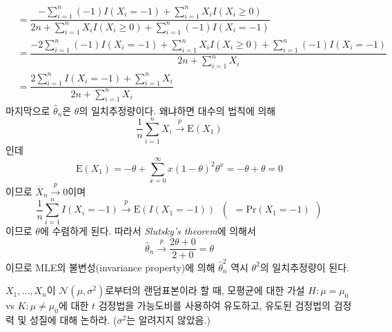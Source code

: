 \documentclass[answers]{exam}
\begin{document}
\begin{questions}
\begin{solution}
\begin{enumerate}[(a)]
\begin{align}
          &= \dfrac{-\displaystyle\sum_{i=1}^{n}\left(-1\right)I\left(X_{i}=-1\right)+\sum_{i=1}^{n}X_{i}I\left(X_{i}\geq 0\right)}{2n+\displaystyle\sum_{i=1}^{n}X_{i}I\left(X_{i}\geq 0\right)+\sum_{i=1}^{n}\left(-1\right)I\left(X_{i}=-1\right)}\\
          &= \dfrac{-2\displaystyle\sum_{i=1}^{n}\left(-1\right)I\left(X_{i}=-1\right)+\sum_{i=1}^{n}X_{i}I\left(X_{i}\geq 0\right)+\sum_{i=1}^{n}\left(-1\right)I\left(X_{i}=-1\right)}{2n+\displaystyle\sum_{i=1}^{n}X_{i}}\\
          &= \dfrac{2\displaystyle\sum_{i=1}^{n}I\left(X_{i}=-1\right)+\sum_{i=1}^{n}X_{i}}{2n+\displaystyle\sum_{i=1}^{n}X_{i}}
        \end{align}
        마지막으로 $\widehat{\theta}_{n}$은 $\theta$의 일치추정량이다. 왜냐하면 대수의 법칙에 의해
        \begin{equation}
          \dfrac{1}{n}\sum_{i=1}^{n}X_{i}\xrightarrow{p} \mathrm{E}\left(X_{1}\right)
        \end{equation}
        인데
        \begin{equation}
          \mathrm{E}\left(X_{1}\right) = -\theta + \sum_{x=0}^{\infty}x\left(1-\theta\right)^{2}\theta^{x} = -\theta+\theta=0
        \end{equation}
        이므로 $\overline{X}_{n}\xrightarrow{p} 0$이며
        \begin{equation}
          \dfrac{1}{n}\sum_{i=1}^{n}I\left(X_{i}=-1\right) \xrightarrow{p} \mathrm{E}\left(I\left(X_{1}=-1\right)\right)\;\;\begin{pmatrix}=\mathrm{Pr}\left(X_{1}=-1\right)\end{pmatrix}
        \end{equation}
        이므로 $\theta$에 수렴하게 된다. 따라서 \emph{Slutsky's theorem}에 의해서
        \begin{equation}
          \widehat{\theta}_{n} \xrightarrow{p} \dfrac{2\theta + 0}{2 + 0} = \theta
        \end{equation}
        이므로 MLE의 불변성(invariance property)에 의해 $\widehat{\theta}_{n}^{2}$ 역시 $\theta^{2}$의 일치추정량이 된다.
      \end{enumerate}
    \end{solution}
    \question
    $X_{1},\ldots,X_{n}$이 $\mathcal{N}\left(\mu,\sigma^{2}\right)$로부터의 랜덤표본이라 할 때, 모평균에 대한 가설 $H:\mu=\mu_{0}$ vs $K:\mu\neq\mu_{0}$에 대한 $t$ 검정법을 가능도비를 사용하여 유도하고, 유도된 검정법의 검정력 및 성질에 대해 논하라. ($\sigma^{2}$는 알려지지 않았음.)

\end{questions}
\end{document}
